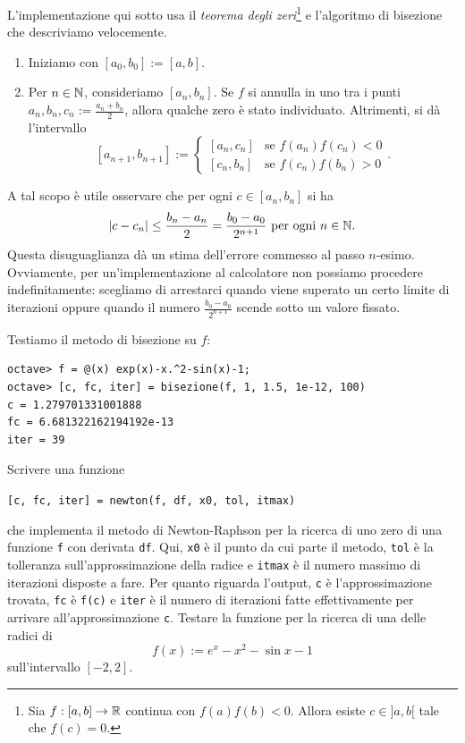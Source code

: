 L'implementazione qui sotto usa il {\em teorema degli zeri}\footnote{Sia \(f : [a, b] \to \mathbb R\) continua con \(f(a)f(b) < 0\). Allora esiste \(c \in ]a, b[\) tale che \(f(c) = 0\).} e l'algoritmo di bisezione che descriviamo velocemente.
\begin{enumerate}
\item Iniziamo con \([a_0, b_0] := [a, b]\).
\item Per \(n \in \mathbb N\), consideriamo \([a_n, b_n]\). Se \(f\) si annulla in uno tra i punti \(a_n, b_n, c_n := \frac{a_n+b_n}{2}\), allora qualche zero è stato individuato. Altrimenti, si dà l'intervallo
\[[a_{n+1}, b_{n+1}] := \begin{cases} [a_n, c_n] & \text{se } f(a_n)f(c_n) < 0 \\ [c_n, b_n] & \text{se } f(c_n)f(b_n) > 0 \end{cases}.\]
\end{enumerate}
A tal scopo è utile osservare che per ogni \(c \in [a_n, b_n]\) si ha
\[\lvert c-c_n \rvert \le \frac{b_n - a_n}{2} = \frac{b_0 - a_0}{2^{n+1}} \text{ per ogni } n \in \mathbb N .\]
Questa disuguaglianza dà un stima dell'errore commesso al passo \(n\)-esimo. Ovviamente, per un'implementazione al calcolatore non possiamo procedere indefinitamente: scegliamo di arrestarci quando viene superato un certo limite di iterazioni oppure quando il numero \(\frac{b_0 - a_0}{2^{n+1}}\) scende sotto un valore fissato.



Testiamo il metodo di bisezione su \(f\):

\begin{lstlisting}[numbers=none]
octave> f = @(x) exp(x)-x.^2-sin(x)-1;
octave> [c, fc, iter] = bisezione(f, 1, 1.5, 1e-12, 100)
c = 1.279701331001888
fc = 6.681322162194192e-13
iter = 39
\end{lstlisting}


\begin{esercizio}
Scrivere una funzione
\begin{center}
\lstinline£[c, fc, iter] = newton(f, df, x0, tol, itmax)£
\end{center}
che implementa il metodo di \textenglish{Newton-Raphson} per la ricerca di uno zero di una funzione \lstinline£f£ con derivata \lstinline£df£. Qui, \lstinline£x0£ è il punto da cui parte il metodo, \lstinline£tol£ è la tolleranza sull'approssimazione della radice e \lstinline£itmax£ è il numero massimo di iterazioni disposte a fare. Per quanto riguarda l'output, \lstinline£c£ è l'approssimazione trovata, \lstinline£fc£ è \lstinline£f(c)£ e \lstinline£iter£ è il numero di iterazioni fatte effettivamente per arrivare all'approssimazione \lstinline£c£. Testare la funzione per la ricerca di una delle radici di
\[f(x) := e^x - x^2 - \sin x - 1\]
sull'intervallo \([-2, 2]\).
\end{esercizio}

